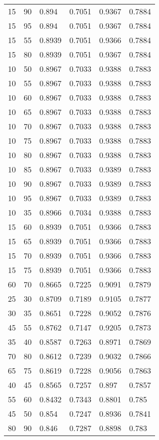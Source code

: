 \begin{center}
\begin{longtable}{|l|l|l|l|l|l|}
15 & 90 & 0.894  & 0.7051 & 0.9367 & 0.7884 \\
15 & 95 & 0.894  & 0.7051 & 0.9367 & 0.7884 \\
15 & 55 & 0.8939 & 0.7051 & 0.9366 & 0.7884 \\
15 & 80 & 0.8939 & 0.7051 & 0.9367 & 0.7884 \\
10 & 50 & 0.8967 & 0.7033 & 0.9388 & 0.7883 \\
10 & 55 & 0.8967 & 0.7033 & 0.9388 & 0.7883 \\
10 & 60 & 0.8967 & 0.7033 & 0.9388 & 0.7883 \\
10 & 65 & 0.8967 & 0.7033 & 0.9388 & 0.7883 \\
10 & 70 & 0.8967 & 0.7033 & 0.9388 & 0.7883 \\
10 & 75 & 0.8967 & 0.7033 & 0.9388 & 0.7883 \\
10 & 80 & 0.8967 & 0.7033 & 0.9388 & 0.7883 \\
10 & 85 & 0.8967 & 0.7033 & 0.9389 & 0.7883 \\
10 & 90 & 0.8967 & 0.7033 & 0.9389 & 0.7883 \\
10 & 95 & 0.8967 & 0.7033 & 0.9389 & 0.7883 \\
10 & 35 & 0.8966 & 0.7034 & 0.9388 & 0.7883 \\
15 & 60 & 0.8939 & 0.7051 & 0.9366 & 0.7883 \\
15 & 65 & 0.8939 & 0.7051 & 0.9366 & 0.7883 \\
15 & 70 & 0.8939 & 0.7051 & 0.9366 & 0.7883 \\
15 & 75 & 0.8939 & 0.7051 & 0.9366 & 0.7883 \\
60 & 70 & 0.8665 & 0.7225 & 0.9091 & 0.7879 \\
25 & 30 & 0.8709 & 0.7189 & 0.9105 & 0.7877 \\
30 & 35 & 0.8651 & 0.7228 & 0.9052 & 0.7876 \\
45 & 55 & 0.8762 & 0.7147 & 0.9205 & 0.7873 \\
35 & 40 & 0.8587 & 0.7263 & 0.8971 & 0.7869 \\
70 & 80 & 0.8612 & 0.7239 & 0.9032 & 0.7866 \\
65 & 75 & 0.8619 & 0.7228 & 0.9056 & 0.7863 \\
40 & 45 & 0.8565 & 0.7257 & 0.897  & 0.7857 \\
55 & 60 & 0.8432 & 0.7343 & 0.8801 & 0.785  \\
45 & 50 & 0.854  & 0.7247 & 0.8936 & 0.7841 \\
80 & 90 & 0.846  & 0.7287 & 0.8898 & 0.783  \\

\end{longtable}
\end{center}
